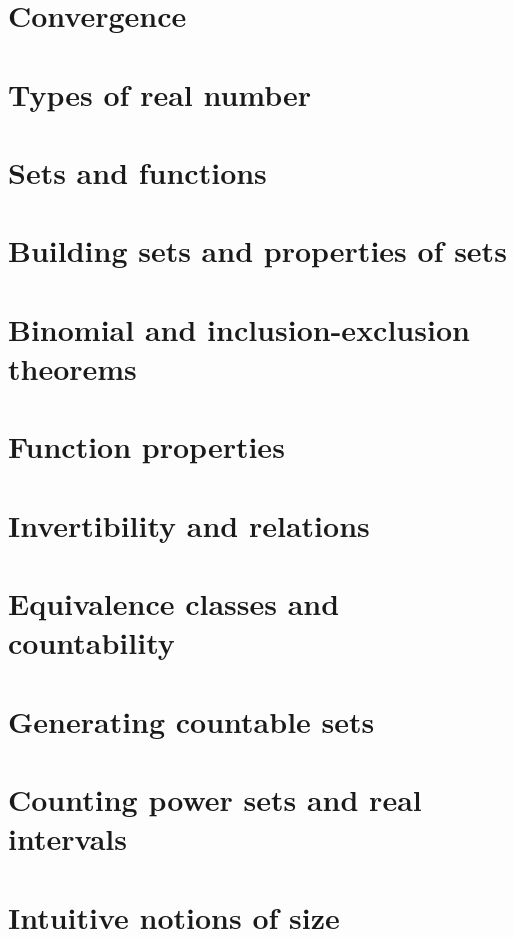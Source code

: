 \documentclass{article}
\begin{document}
\section{Convergence}

\section{Types of real number}

\section{Sets and functions}

\section{Building sets and properties of sets}

\section{Binomial and inclusion-exclusion theorems}

\section{Function properties}

\section{Invertibility and relations}

\section{Equivalence classes and countability}

\section{Generating countable sets}

\section{Counting power sets and real intervals}

\section{Intuitive notions of size}

\end{document}
